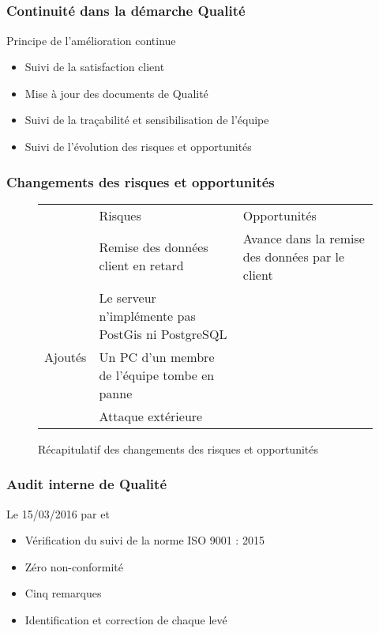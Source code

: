 
\speaker{\Pierre}

\subsection{} %


\begin{frame}
\frametitle{Continuité dans la démarche Qualité}
\begin{block}{Principe de l'amélioration continue}
\begin{itemize}
\item Suivi de la satisfaction client
\item Mise à jour des documents de Qualité
\item Suivi de la traçabilité et sensibilisation de l'équipe
\item Suivi de l'évolution des risques et opportunités
\end{itemize}
\end{block}
\end{frame}




\begin{frame}
\frametitle{Changements des risques et opportunités}
\begin{figure}
\begin{longtable}{|p{2.5cm}||p{2.5cm}|p{2.5cm}|}
\hline
 & \small Risques & \small Opportunités \\\hhline{|=||=|=|}
\multirow{3}{*}{\small Supprimés} & \small Remise des données client en retard & \small Avance dans la remise des données par le client \\\hline

\multirow{3}{*}{\small Ajoutés} & \small Le serveur n’implémente pas PostGis ni PostgreSQL & \\ \cline{2-2}
 & \small Un PC d’un membre de l’équipe tombe en panne & \\\cline{2-2}
 &  \small Attaque extérieure & \\\hline


\end{longtable}
\caption{Récapitulatif des changements des risques et opportunités}
\end{figure}
\end{frame}



\begin{frame}
\frametitle{Audit interne de Qualité}
\begin{block}{Le 15/03/2016 par \nomApprobateur{} et \nomTuteurQualite{}}
\begin{itemize}
\item Vérification du suivi de la norme ISO 9001 : 2015
\item Zéro non-conformité
\item Cinq remarques
\item Identification et correction de chaque \FT{} levé
\end{itemize}
\end{block}
\end{frame}





